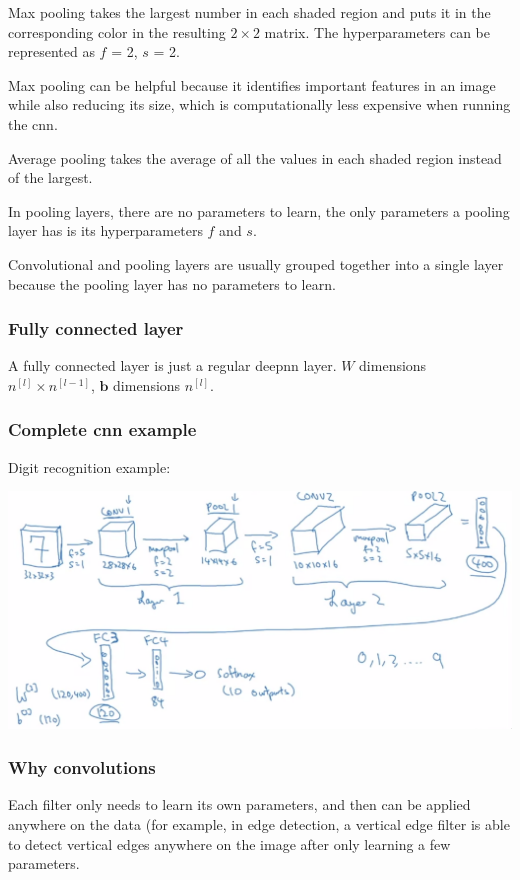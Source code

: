 \documentclass[12pt]{article}
\begin{document}
Max pooling takes the largest number in each shaded region and puts it in the corresponding
color in the resulting $2 \times 2$ matrix. The hyperparameters can be represented as $f$ = 2,
$s$ = 2.

Max pooling can be helpful because it identifies important features in an image while also
reducing its size, which is computationally less expensive when running the cnn.

Average pooling takes the average of all the values in each shaded region instead of the
largest.

In pooling layers, there are no parameters to learn, the only parameters a pooling layer
has is its hyperparameters $f$ and $s$.

Convolutional and pooling layers are usually grouped together into a single layer because
the pooling layer has no parameters to learn.

\subsubsection{Fully connected layer}

A fully connected layer is just a regular deepnn layer. $W$ dimensions $n^{[l]} \times n^{[l-1]}$,
$\bm b$ dimensions $n^{[l]}$.

\subsubsection{Complete cnn example}

Digit recognition example:

\includegraphics[scale=.4]{images/cnn-example.png}

\subsubsection{Why convolutions}

Each filter only needs to learn its own parameters, and then can be applied anywhere on the
data (for example, in edge detection, a vertical edge filter is able to detect vertical edges
anywhere on the image after only learning a few parameters.
\end{document}
